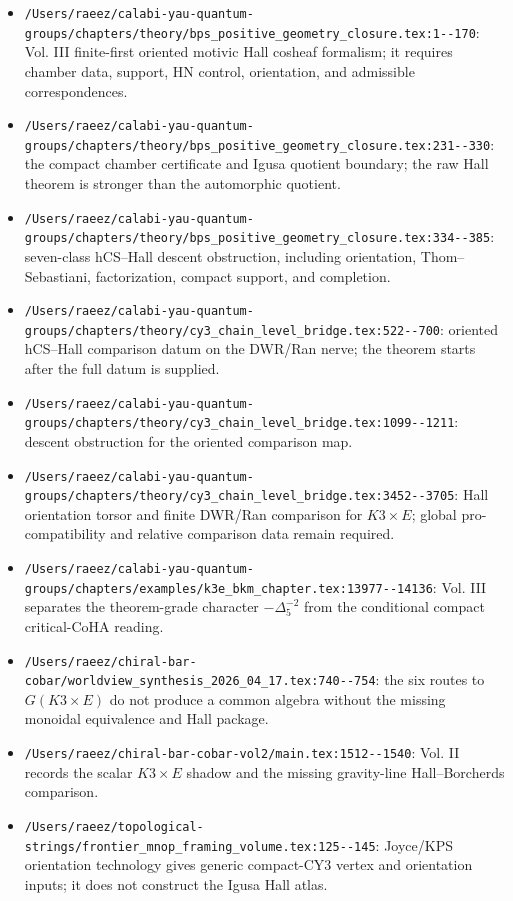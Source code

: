 \begin{itemize}
bar--cobar inversion is downstream of a supplied curve-level object.
\item \verb|/Users/raeez/calabi-yau-quantum-groups/chapters/theory/bps_positive_geometry_closure.tex:1--170|:
Vol. III finite-first oriented motivic Hall cosheaf formalism; it
requires chamber data, support, HN control, orientation, and admissible
correspondences.
\item \verb|/Users/raeez/calabi-yau-quantum-groups/chapters/theory/bps_positive_geometry_closure.tex:231--330|:
the compact chamber certificate and Igusa quotient boundary; the raw
Hall theorem is stronger than the automorphic quotient.
\item \verb|/Users/raeez/calabi-yau-quantum-groups/chapters/theory/bps_positive_geometry_closure.tex:334--385|:
seven-class hCS--Hall descent obstruction, including orientation,
Thom--Sebastiani, factorization, compact support, and completion.
\item \verb|/Users/raeez/calabi-yau-quantum-groups/chapters/theory/cy3_chain_level_bridge.tex:522--700|:
oriented hCS--Hall comparison datum on the DWR/Ran nerve; the theorem
starts after the full datum is supplied.
\item \verb|/Users/raeez/calabi-yau-quantum-groups/chapters/theory/cy3_chain_level_bridge.tex:1099--1211|:
descent obstruction for the oriented comparison map.
\item \verb|/Users/raeez/calabi-yau-quantum-groups/chapters/theory/cy3_chain_level_bridge.tex:3452--3705|:
Hall orientation torsor and finite DWR/Ran comparison for \(K3\times E\);
global pro-compatibility and relative comparison data remain required.
\item \verb|/Users/raeez/calabi-yau-quantum-groups/chapters/examples/k3e_bkm_chapter.tex:13977--14136|:
Vol. III separates the theorem-grade character
\(-\Delta_5^{-2}\) from the conditional compact critical-CoHA reading.
\item \verb|/Users/raeez/chiral-bar-cobar/worldview_synthesis_2026_04_17.tex:740--754|:
the six routes to \(G(K3\times E)\) do not produce a common algebra
without the missing monoidal equivalence and Hall package.
\item \verb|/Users/raeez/chiral-bar-cobar-vol2/main.tex:1512--1540|:
Vol. II records the scalar \(K3\times E\) shadow and the missing
gravity-line Hall--Borcherds comparison.
\item \verb|/Users/raeez/topological-strings/frontier_mnop_framing_volume.tex:125--145|:
Joyce/KPS orientation technology gives generic compact-CY3 vertex and
orientation inputs; it does not construct the Igusa Hall atlas.
\end{itemize}

